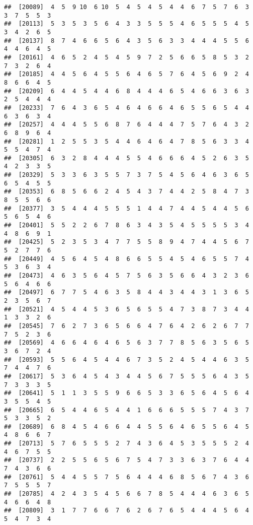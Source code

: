 \documentclass[
]{book}
\begin{document}
\begin{verbatim}
##  [20089]  4  5  9 10  6 10  5  4  5  4  5  4  4  6  7  5  7  6  3  3  7  5  5  3
##  [20113]  5  3  5  3  5  6  4  3  3  5  5  5  4  6  5  5  5  4  5  3  4  2  6  5
##  [20137]  8  7  4  6  6  5  6  4  3  5  6  3  3  4  4  4  5  5  6  4  4  6  4  5
##  [20161]  4  6  5  2  4  5  4  5  9  7  2  5  6  6  5  8  5  3  2  7  3  2  6  4
##  [20185]  4  4  5  6  4  5  5  6  4  6  5  7  6  4  5  6  9  2  4  8  6  6  4  5
##  [20209]  6  4  4  5  4  4  6  8  4  4  4  6  5  4  6  6  3  6  3  2  5  4  4  4
##  [20233]  7  6  4  3  6  5  4  6  4  6  6  4  6  5  5  6  5  4  4  6  3  6  3  4
##  [20257]  4  4  4  5  5  6  8  7  6  4  4  4  7  5  7  6  4  3  2  6  8  9  6  4
##  [20281]  1  2  5  5  3  5  4  4  6  4  6  4  7  8  5  6  3  3  4  5  5  4  7  4
##  [20305]  6  3  2  8  4  4  4  5  5  4  6  6  6  4  5  2  6  3  5  4  2  3  3  5
##  [20329]  5  3  3  6  3  5  5  7  3  7  5  4  5  6  4  6  3  6  5  6  5  4  5  5
##  [20353]  6  8  5  6  6  2  4  5  4  3  7  4  4  2  5  8  4  7  3  8  5  5  6  6
##  [20377]  3  5  4  4  4  5  5  5  1  4  4  7  4  4  5  4  4  5  6  5  6  5  4  6
##  [20401]  5  5  2  2  6  7  8  6  3  4  3  5  4  5  5  5  5  3  4  4  8  6  9  1
##  [20425]  5  2  3  5  3  4  7  7  5  5  8  9  4  7  4  4  5  6  7  5  2  7  7  6
##  [20449]  4  5  6  4  5  4  8  6  6  5  5  4  5  4  6  5  5  7  4  5  3  6  3  4
##  [20473]  4  6  3  5  6  4  5  7  5  6  3  5  6  6  4  3  2  3  6  5  6  4  6  6
##  [20497]  6  7  7  5  4  6  3  5  8  4  4  3  4  4  3  1  3  6  5  2  3  5  6  7
##  [20521]  4  5  4  4  5  3  6  5  6  5  5  4  7  3  8  7  3  4  4  1  3  3  2  6
##  [20545]  7  6  2  7  3  6  5  6  6  4  7  6  4  2  6  2  6  7  7  7  5  2  3  6
##  [20569]  4  6  6  4  6  4  6  5  6  3  7  7  8  5  6  3  5  6  5  3  6  7  2  4
##  [20593]  5  5  6  4  5  4  4  6  7  3  5  2  4  5  4  4  6  3  5  7  4  4  7  6
##  [20617]  5  3  6  4  5  4  3  4  4  5  6  7  5  5  5  6  4  3  5  7  3  3  3  5
##  [20641]  5  1  1  3  5  5  9  6  6  5  3  3  6  5  6  4  5  6  4  3  5  5  4  5
##  [20665]  6  5  4  4  6  5  4  4  1  6  6  6  5  5  5  7  4  3  7  5  3  3  5  2
##  [20689]  6  8  4  5  4  6  6  4  4  5  5  6  4  6  5  5  6  4  5  4  8  6  6  7
##  [20713]  5  7  6  5  5  5  2  7  4  3  6  4  5  3  5  5  5  2  4  4  6  7  5  5
##  [20737]  2  2  5  5  6  5  6  7  5  4  7  3  3  6  3  7  6  4  4  7  4  3  6  6
##  [20761]  5  4  4  5  5  7  5  6  4  4  4  6  8  5  6  7  4  3  6  7  5  5  5  7
##  [20785]  4  2  4  3  5  4  5  6  6  7  8  5  4  4  4  6  3  6  5  4  6  6  4  8
##  [20809]  3  1  7  7  6  6  7  6  2  6  7  6  5  4  4  4  5  6  4  5  4  7  3  4

\end{verbatim}
\end{document}
